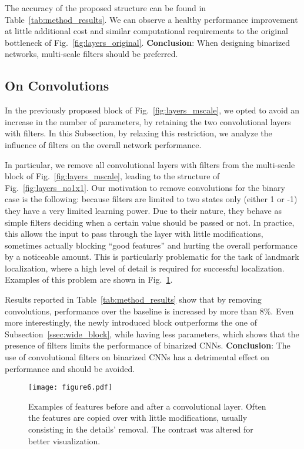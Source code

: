 \documentclass[10pt,journal,compsoc]{IEEEtran}
\begin{document}
The accuracy of the proposed structure can be found in Table~\ref{tab:method_results}. We can observe a healthy performance improvement at little additional cost and similar computational requirements to the original bottleneck of Fig.~\ref{fig:layers_original}. \newline\textbf{Conclusion}: When designing binarized networks, multi-scale filters should be preferred.

\subsection{On  Convolutions}\label{ssec:conv1}

In the previously proposed block of Fig.~\ref{fig:layers_mscale}, we opted to avoid an increase in the number of parameters, by retaining the two convolutional layers with  filters. In this Subsection, by relaxing this restriction, we analyze the influence of  filters on the overall network performance.

In particular, we remove all convolutional layers with  filters from the multi-scale block of Fig.~\ref{fig:layers_mscale}, leading to the structure of  Fig.~\ref{fig:layers_no1x1}. Our motivation to remove  convolutions for the binary case is the following: because  filters are limited to two states only (either 1 or -1) they have a very limited learning power. Due to their nature, they behave as simple filters deciding when a certain value should be passed or not. In practice, this allows the input to pass through the layer with little modifications, sometimes actually blocking ``good features'' and hurting the overall performance by a noticeable amount. This is particularly problematic for the task of landmark localization, where a high level of detail is required for successful localization. Examples of this problem are shown in Fig.~\ref{fig:ifilters_1x1}.

Results reported in Table~\ref{tab:method_results} show that by removing  convolutions, performance over the baseline is increased by more than 8\%. Even more interestingly, the newly introduced block outperforms the one of Subsection~\ref{ssec:wide_block}, while having less parameters, which shows that the presence of  filters limits the performance of binarized CNNs. \newline \textbf{Conclusion}: The use of  convolutional filters on binarized CNNs has a detrimental effect on performance and should be avoided.

\begin{figure}[!htb]
    \centering
    \texttt{[image: figure6.pdf]}
    \caption{Examples of features before and after a  convolutional layer. Often the features are copied over with little modifications, usually consisting in the details' removal. The contrast was altered for better visualization.}
    \label{fig:ifilters_1x1}
\end{figure}
\end{document}
